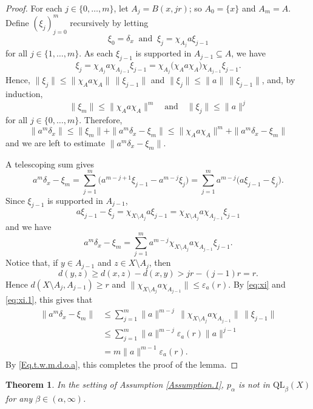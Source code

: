 \documentclass[11pt]{amsart}
\numberwithin{equation}{section}
\newtheorem{theorem}{Theorem}[section]
\theoremstyle{definition}
\theoremstyle{remark}
\begin{document}
 \begin{proof}
For each $j\in\{0,\dots,m\}$, let $A_j=B(x,j r)$; so $A_0=\{x\}$ and $A_m=A$. Define $(\xi_j)_{j=0}^m$ recursively by letting  \[\xi_0=\delta_x \ \text{ and }\ \xi_j=\chi_{A_j}a\xi_{j-1}\] for all $j\in\{1,\dots,m\}$. As each $\xi_{j-1}$ is supported in $A_{j-1}\subseteq A$, we have
\[
\xi_j=\chi_{A_j}a\chi_{A_{j-1}}\xi_{j-1}=\chi_{A_j}\big(\chi_Aa\chi_A\big)\chi_{A_{j-1}}\xi_{j-1}.
\]
Hence,   $\|\xi_j\|\leq\|\chi_Aa\chi_A\|\,\|\xi_{j-1}\|$ and  $\|\xi_j\|\leq\|a\|\,\|\xi_{j-1}\|$, and, by induction,
\begin{equation}\label{eq:xi}
\|\xi_m\|\leq\|\chi_Aa\chi_A\|^m\quad\text{and}\quad\|\xi_j\|\leq\|a\|^j
\end{equation}
for all $j\in \{0,\ldots, m\}$.
Therefore,
\begin{equation}\label{Eq.t.w.m.d.o.a}
    \|a^m\delta_x\|\leq \|\xi_m\|+\|a^m\delta_x-\xi_m\|\leq \|\chi_Aa\chi_A\|^m+\|a^m\delta_x-\xi_m\|
\end{equation}
and we are left to estimate $\|a^m\delta_x-\xi_m\|$.


A telescoping sum gives
\[
a^m\delta_x-\xi_m=\sum_{j=1}^m\big(a^{m-j+1}\xi_{j-1}-a^{m-j}\xi_j\big)=\sum_{j=1}^m a^{m-j}\big(a\xi_{j-1}-\xi_j\big).
\]
Since $\xi_{j-1}$ is supported in $A_{j-1}$,
\[
a\xi_{j-1}-\xi_j=\chi_{X\setminus A_j}a\xi_{j-1}=\chi_{X\setminus A_j}a\chi_{A_{j-1}}\xi_{j-1}
\]
and we have
\begin{equation}\label{eq:xi.1}
a^m\delta_x-\xi_m=\sum_{j=1}^m a^{m-j}\chi_{X\setminus A_j}a\chi_{A_{j-1}}\xi_{j-1}.
\end{equation}
Notice that, if $y\in A_{j-1}$ and $z\in X\setminus A_j$, then \[d(y,z)\geq d(x,z)-d(x,y)>j r-(j-1)r=r.\] Hence $d(X\setminus A_j,A_{j-1})\geq r$ and $\|\chi_{X\setminus A_j}a\chi_{A_{j-1}}\|\leq\varepsilon_a(r)$. By \eqref{eq:xi} and \eqref{eq:xi.1}, this gives that
\begin{align*}
\|a^m\delta_x-\xi_m\|&\leq\sum_{j=1}^m\|a\|^{m-j}\,\|\chi_{X\setminus A_j}a\chi_{A_{j-1}}\|\,\|\xi_{j-1}\|\\
&\leq\sum_{j=1}^m\|a\|^{m-j}\varepsilon_a(r)\|a\|^{j-1}\\
&=m\|a\|^{m-1}\varepsilon_a(r).
\end{align*}
By \eqref{Eq.t.w.m.d.o.a}, this completes the proof of the lemma.
    \end{proof}




\begin{theorem}
    \label{Thm.QLthetaDoesNotContainP} In the setting of Assumption \ref{Assumption.1}, $p_\alpha$ is not in $\mathrm{QL}_{\beta}(X)$ for any $\beta\in (\alpha,\infty)$.
\end{theorem}
\end{document}
